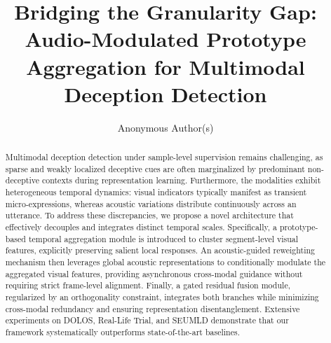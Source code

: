 \documentclass[sigconf,screen,review,anonymous]{acmart}
\begin{document}
\title{Bridging the Granularity Gap: Audio-Modulated Prototype Aggregation for Multimodal Deception Detection}
\author{Anonymous Author(s)}

\renewcommand{\shortauthors}{Anonymous et al.}

\begin{abstract}

Multimodal deception detection under sample-level supervision remains challenging, as sparse and weakly localized deceptive cues are often marginalized by predominant non-deceptive contexts during representation learning. Furthermore, the modalities exhibit heterogeneous temporal dynamics: visual indicators typically manifest as transient micro-expressions, whereas acoustic variations distribute continuously across an utterance. To address these discrepancies, we propose a novel architecture that effectively decouples and integrates distinct temporal scales. Specifically, a prototype-based temporal aggregation module is introduced to cluster segment-level visual features, explicitly preserving salient local responses. An acoustic-guided reweighting mechanism then leverages global acoustic representations to conditionally modulate the aggregated visual features, providing asynchronous cross-modal guidance without requiring strict frame-level alignment. Finally, a gated residual fusion module, regularized by an orthogonality constraint, integrates both branches while minimizing cross-modal redundancy and ensuring representation disentanglement. Extensive experiments on DOLOS, Real-Life Trial, and SEUMLD demonstrate that our framework systematically outperforms state-of-the-art baselines.

\end{abstract}
\end{document}
